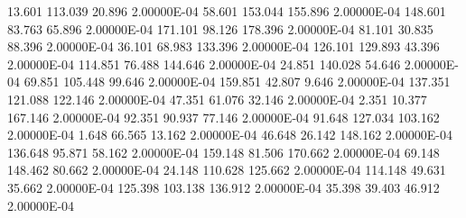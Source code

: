     13.601   113.039    20.896  2.00000E-04
    58.601   153.044   155.896  2.00000E-04
   148.601    83.763    65.896  2.00000E-04
   171.101    98.126   178.396  2.00000E-04
    81.101    30.835    88.396  2.00000E-04
    36.101    68.983   133.396  2.00000E-04
   126.101   129.893    43.396  2.00000E-04
   114.851    76.488   144.646  2.00000E-04
    24.851   140.028    54.646  2.00000E-04
    69.851   105.448    99.646  2.00000E-04
   159.851    42.807     9.646  2.00000E-04
   137.351   121.088   122.146  2.00000E-04
    47.351    61.076    32.146  2.00000E-04
     2.351    10.377   167.146  2.00000E-04
    92.351    90.937    77.146  2.00000E-04
    91.648   127.034   103.162  2.00000E-04
     1.648    66.565    13.162  2.00000E-04
    46.648    26.142   148.162  2.00000E-04
   136.648    95.871    58.162  2.00000E-04
   159.148    81.506   170.662  2.00000E-04
    69.148   148.462    80.662  2.00000E-04
    24.148   110.628   125.662  2.00000E-04
   114.148    49.631    35.662  2.00000E-04
   125.398   103.138   136.912  2.00000E-04
    35.398    39.403    46.912  2.00000E-04